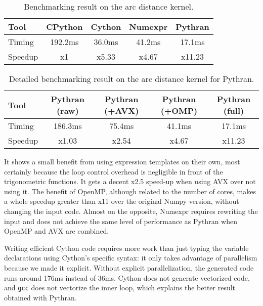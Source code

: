 \documentclass[10pt, onecolumn, preprint]{sigplanconf}
\begin{document}
\begin{table}
    \centering
    \begin{tabular}{|l|c|c|c|c|}
    \hline
     Tool    &  CPython    &  Cython  &  Numexpr    & Pythran   \\
    \hline
     Timing  &  192.2ms    &  36.0ms  &    41.2ms   &  17.1ms   \\
    \hline
     Speedup &  x1         &  x5.33   &  x4.67      &  x11.23   \\
    \hline
\end{tabular}
\caption{Benchmarking result on the arc distance kernel.}
\label{tbl:arc-distance}
\end{table}

\begin{table}
    \centering
    \begin{tabular}{|l|c|c|c|c|}
    \hline
    Tool & Pythran (raw) & Pythran (+AVX) & Pythran (+OMP) & Pythran (full)  \\
    \hline
    Timing & 186.3ms     &    75.4ms      &    41.1ms      &  17.1ms         \\
    \hline
    Speedup&    x1.03      &    x2.54       &    x4.67       &  x11.23         \\
    \hline
\end{tabular}
\caption{Detailed benchmarking result on the arc distance kernel for Pythran.}
\label{tbl:arc-distance-2}
\end{table}

It shows a small benefit from using expression templates on their own, most
certainly because the loop control overhead is negligible in front of the
trigonometric functions. It gets a decent x2.5 speed-up when using AVX over not
using it. The benefit of OpenMP, although related to the number of cores, makes
a whole speedup greater than x11 over the original Numpy version, without
changing the input code. Almost on the opposite, Numexpr requires rewriting the 
input and does not achieve the same level of performance as Pythran when OpenMP
and AVX are combined.

Writing efficient Cython code requires more work than just typing the variable
declarations using Cython's specific syntax: it only takes advantage of
parallelism because we made it explicit. Without explicit parallelization,
the generated code runs around 176ms instead of 36ms. Cython does not generate
vectorized code, and \texttt{gcc} does not vectorize the inner loop, which 
explains the better result obtained with Pythran.
\end{document}
